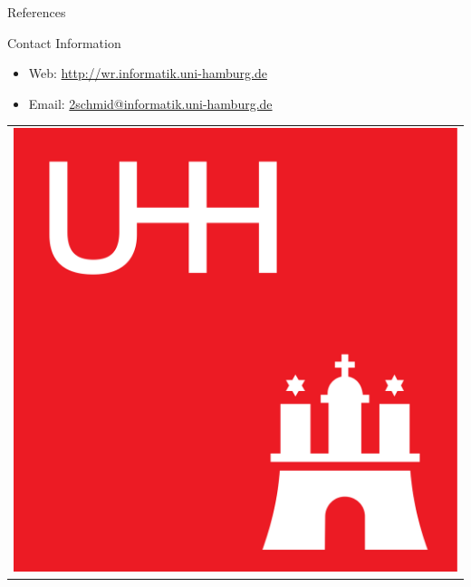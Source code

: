 \documentclass[final]{beamer}
\newlength{\onecolwid}
\begin{document}
\begin{frame}[t]
\begin{columns}[t]
\begin{column}{\onecolwid}
\begin{block}{References}
\end{block}


%
%
%



\begin{alertblock}{Contact Information}

\begin{itemize}
\item Web: \href{http://wr.informatik.uni-hamburg.de}{http://wr.informatik.uni-hamburg.de}
\item Email: \href{mailto:2schmid@informatik.uni-hamburg.de}{2schmid@informatik.uni-hamburg.de}
\end{itemize}

\end{alertblock}

\begin{flushright}
\begin{tabular}{r}
\includegraphics[width=0.2\linewidth]{src/2000px-Unihamburg-logo.png} %
\end{tabular}
\end{flushright}


\end{column} %

\end{columns} %

\end{frame} %
\end{document}
